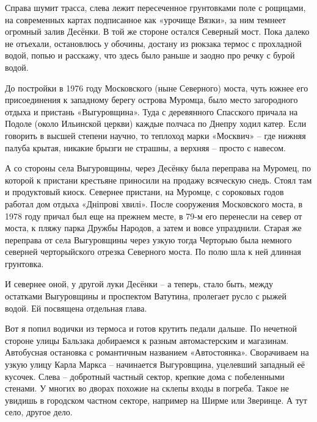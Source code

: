 Справа шумит трасса, слева лежит пересеченное грунтовками поле с рощицами, на современных картах подписанное как «урочище Вязки», за ним темнеет огромный залив Десёнки. В той же стороне остался Северный мост. Пока далеко не отъехали, остановлюсь у обочины, достану из рюкзака термос с прохладной водой, попью и расскажу, что здесь было раньше и заодно про речку с бурой водой.

До постройки в 1976 году Московского (ныне Северного) моста, чуть южнее его присоединения к западному берегу острова Муромца, было место загородного отдыха и пристань «Выгуровщина». Туда с деревянного Спасского причала на Подоле (около Ильинской церкви) каждые полчаса по Днепру ходил катер. Если говорить в высшей степени научно, то теплоход марки «Москвич» – где нижняя палуба крытая, никакие брызги не страшны, а верхняя – просто с навесом. 

А со стороны села Выгуровщины, через Десёнку была переправа на Муромец, по которой к пристани крестьяне приносили на продажу всяческую снедь. Стоял там и продуктовый киоск. Севернее пристани, на Муромце, с сороковых годов работал дом отдыха «Дніпрові хвилі». После сооружения Московского моста, в 1978 году причал был еще на прежнем месте, в 79-м его перенесли на север от моста, к пляжу парка Дружбы Народов, а затем и вовсе упразднили. Старая же переправа от села Выгуровщины через узкую тогда Черторыю была немного северней черторыйского отрезка Северного моста. По полю шла к ней длинная грунтовка.

И севернее оной, у другой луки Десёнки – а теперь, стало быть, между остатками Выгуровщины и проспектом Ватутина, пролегает русло с рыжей водой. Ей посвящена отдельная глава.


Вот я попил водички из термоса и готов крутить педали дальше. По нечетной стороне улицы Бальзака добираемся к разным автомастерским и магазинам. Автобусная остановка с романтичным названием «Автостоянка». Сворачиваем на узкую улицу Карла Маркса – начинается Выгуровщина, уцелевший западный её кусочек. Слева – добротный частный сектор, крепкие дома с побеленными стенами. У многих во дворах похожие на склепы входы в погреба. Такое не увидишь в городском частном секторе, например на Ширме или Зверинце. А тут село, другое дело.

